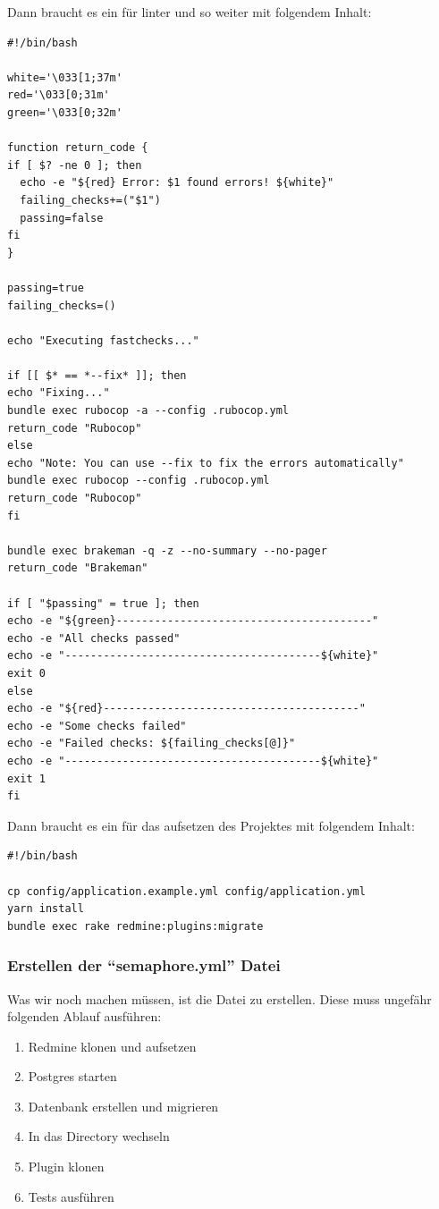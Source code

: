 \newpage
Dann braucht es ein  für linter und so weiter mit folgendem Inhalt:
\begin{codebox}[]
  \begin{verbatim}
#!/bin/bash

white='\033[1;37m'
red='\033[0;31m'
green='\033[0;32m'

function return_code {
if [ $? -ne 0 ]; then
  echo -e "${red} Error: $1 found errors! ${white}"
  failing_checks+=("$1")
  passing=false
fi
}

passing=true
failing_checks=()

echo "Executing fastchecks..."

if [[ $* == *--fix* ]]; then
echo "Fixing..."
bundle exec rubocop -a --config .rubocop.yml
return_code "Rubocop"
else 
echo "Note: You can use --fix to fix the errors automatically"
bundle exec rubocop --config .rubocop.yml
return_code "Rubocop"
fi

bundle exec brakeman -q -z --no-summary --no-pager
return_code "Brakeman"

if [ "$passing" = true ]; then
echo -e "${green}----------------------------------------"
echo -e "All checks passed"
echo -e "----------------------------------------${white}"
exit 0
else
echo -e "${red}----------------------------------------"
echo -e "Some checks failed"
echo -e "Failed checks: ${failing_checks[@]}"
echo -e "----------------------------------------${white}"
exit 1
fi
  \end{verbatim}
\end{codebox}

\newpage
Dann braucht es ein  für das aufsetzen des Projektes mit folgendem Inhalt:
\begin{codebox}[]
  \begin{verbatim}
#!/bin/bash

cp config/application.example.yml config/application.yml
yarn install
bundle exec rake redmine:plugins:migrate
  \end{verbatim}
\end{codebox}

\subsubsection{Erstellen der \enquote{semaphore.yml} Datei}
Was wir noch machen müssen, ist die  Datei zu erstellen. Diese muss ungefähr folgenden Ablauf
ausführen:
\begin{enumerate}
\item Redmine klonen und aufsetzen
\item Postgres starten
\item Datenbank erstellen und migrieren
\item In das  Directory wechseln
\item Plugin klonen
\item Tests ausführen
\end{enumerate}

